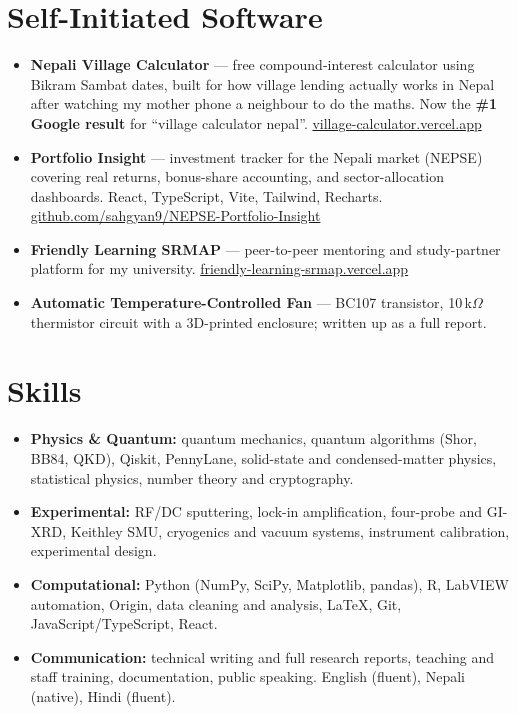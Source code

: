 \documentclass[a4paper,10pt]{article}
\begin{document}
\section*{Self-Initiated Software}
\begin{itemize}
    \item \textbf{Nepali Village Calculator} --- free compound-interest calculator using Bikram Sambat dates, built
          for how village lending actually works in Nepal after watching my mother phone a neighbour to do the maths.
          Now the \textbf{\#1 Google result} for ``village calculator nepal''.
          \href{https://village-calculator.vercel.app}{village-calculator.vercel.app}
    \item \textbf{Portfolio Insight} --- investment tracker for the Nepali market (NEPSE) covering real returns,
          bonus-share accounting, and sector-allocation dashboards. React, TypeScript, Vite, Tailwind, Recharts.
          \href{https://github.com/sahgyan9/NEPSE-Portfolio-Insight}{github.com/sahgyan9/NEPSE-Portfolio-Insight}
    \item \textbf{Friendly Learning SRMAP} --- peer-to-peer mentoring and study-partner platform for my university.
          \href{https://friendly-learning-srmap.vercel.app/}{friendly-learning-srmap.vercel.app}
    \item \textbf{Automatic Temperature-Controlled Fan} --- BC107 transistor, 10\,k$\Omega$ thermistor circuit with a
          3D-printed enclosure; written up as a full report.
\end{itemize}

\section*{Skills}
\begin{itemize}
    \item \textbf{Physics \& Quantum:} quantum mechanics, quantum algorithms (Shor, BB84, QKD), Qiskit, PennyLane,
          solid-state and condensed-matter physics, statistical physics, number theory and cryptography.
    \item \textbf{Experimental:} RF/DC sputtering, lock-in amplification, four-probe and GI-XRD, Keithley SMU,
          cryogenics and vacuum systems, instrument calibration, experimental design.
    \item \textbf{Computational:} Python (NumPy, SciPy, Matplotlib, pandas), R, LabVIEW automation, Origin,
          data cleaning and analysis, LaTeX, Git, JavaScript/TypeScript, React.
    \item \textbf{Communication:} technical writing and full research reports, teaching and staff training,
          documentation, public speaking. English (fluent), Nepali (native), Hindi (fluent).
\end{itemize}
\end{document}
